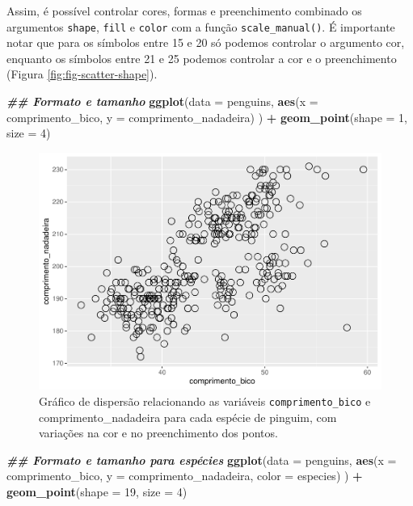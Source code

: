 \documentclass[
]{article}
\newenvironment{Shaded}{\begin{snugshade}}{\end{snugshade}}
\newcommand{\AttributeTok}[1]{\textcolor[rgb]{0.13,0.29,0.53}{#1}}
\newcommand{\DecValTok}[1]{\textcolor[rgb]{0.00,0.00,0.81}{#1}}
\newcommand{\DocumentationTok}[1]{\textcolor[rgb]{0.56,0.35,0.01}{\textbf{\textit{#1}}}}
\newcommand{\FunctionTok}[1]{\textcolor[rgb]{0.13,0.29,0.53}{\textbf{#1}}}
\newcommand{\NormalTok}[1]{#1}
\newcommand{\SpecialCharTok}[1]{\textcolor[rgb]{0.81,0.36,0.00}{\textbf{#1}}}
\begin{document}
Assim, é possível controlar cores, formas e preenchimento combinado os argumentos \texttt{shape}, \texttt{fill} e \texttt{color} com a função \texttt{scale\_manual()}. É importante notar que para os símbolos entre 15 e 20 só podemos controlar o argumento cor, enquanto os símbolos entre 21 e 25 podemos controlar a cor e o preenchimento (Figura \ref{fig:fig-scatter-shape}).

\begin{Shaded}
\begin{Highlighting}[]
\DocumentationTok{\#\# Formato e tamanho}
\FunctionTok{ggplot}\NormalTok{(}\AttributeTok{data =}\NormalTok{ penguins, }
       \FunctionTok{aes}\NormalTok{(}\AttributeTok{x =}\NormalTok{ comprimento\_bico, }\AttributeTok{y =}\NormalTok{ comprimento\_nadadeira)}
\NormalTok{       ) }\SpecialCharTok{+}
    \FunctionTok{geom\_point}\NormalTok{(}\AttributeTok{shape =} \DecValTok{1}\NormalTok{, }\AttributeTok{size =} \DecValTok{4}\NormalTok{)}
\end{Highlighting}
\end{Shaded}

\begin{figure}
\centering
\includegraphics{epr_files/figure-latex/fig-scatter-shape-1.pdf}
\caption{\label{fig:fig-scatter-shape-1}Gráfico de dispersão relacionando as variáveis \texttt{comprimento\_bico} e comprimento\_nadadeira para cada espécie de pinguim, com variações na cor e no preenchimento dos pontos.}
\end{figure}

\begin{Shaded}
\begin{Highlighting}[]
\DocumentationTok{\#\# Formato e tamanho para espécies}
\FunctionTok{ggplot}\NormalTok{(}\AttributeTok{data =}\NormalTok{ penguins, }
       \FunctionTok{aes}\NormalTok{(}\AttributeTok{x =}\NormalTok{ comprimento\_bico, }\AttributeTok{y =}\NormalTok{ comprimento\_nadadeira, }\AttributeTok{color =}\NormalTok{ especies)}
\NormalTok{       ) }\SpecialCharTok{+}
    \FunctionTok{geom\_point}\NormalTok{(}\AttributeTok{shape =} \DecValTok{19}\NormalTok{, }\AttributeTok{size =} \DecValTok{4}\NormalTok{)}
\end{Highlighting}
\end{Shaded}
\end{document}
